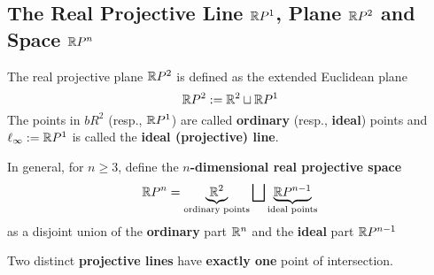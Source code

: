 \subsection{The Real Projective Line \(\mathbb{R} P^1\), Plane \(\mathbb{R} P^2\) and Space \(\mathbb{R} P^n\)}

\begin{definition}
    \begin{statements}{}
        \item The real projective plane \(\mathbb{R} P^2\) is defined as the extended Euclidean plane
        \[\mathbb{R} P^2 := \mathbb{R}^2 \sqcup \mathbb{R} P^1\]
        The points in \(bR^2\) (resp., \(\mathbb{R} P^1\)) are called \textbf{ordinary} (resp., \textbf{ideal}) points and \(\ell_\infty := \mathbb{R} P^1\) is called the \textbf{ideal (projective) line}.
        \item In general, for \(n \geq 3\), define the \textbf{\(n\)-dimensional real projective space}
        \[\mathbb{R} P^n = \underbrace{\mathbb{R}^2}_{\text{ordinary points}} \bigsqcup \underbrace{\mathbb{R} P^{n- 1}}_{\text{ideal points}}\]
        as a disjoint union of the \textbf{ordinary} part \(\mathbb{R}^n\) and the \textbf{ideal} part \(\mathbb{R} P^{n-1}\)
    \end{statements}
\end{definition}

\begin{proposition}
    Two distinct \textbf{projective lines} have \textbf{exactly one} point of intersection.
\end{proposition}